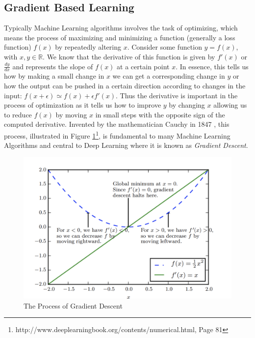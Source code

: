 \documentclass[14pt]{extarticle}
\numberwithin{equation}{section}
\begin{document}
		\subsection{Gradient Based Learning}		
		Typically Machine Learning algorithms involves the task of optimizing, which means the process of maximizing and minimizing a function (generally a loss function) $f(x)$ by repeatedly altering $x$\cite{Goodfellow-et-al-2016}.
		Consider some function $y = f(x)$, with $x, y \in \mathbb{R}$. We know that the derivative of this function is given by $f'(x) $ or $\frac{dy}{dx}$ and represents the slope of $f(x)$ at a certain point $x$. In essence, this tells us how by making a small change in $x$ we can get a corresponding change in $y$ or how the output can be pushed in a certain direction according to changes in the input: $f(x + \epsilon) \simeq f(x) + \epsilon f'(x)$.  Thus the derivative is important in the process of optimization as it tells us how to improve $y$ by changing $x$ allowing us to reduce $f(x)$ by moving $x$ in small steps with the opposite sign of the computed derivative. Invented by the mathematician Cauchy in 1847 \cite{cauchy1847methode}, this process, illustrated in Figure \ref{grad_descent}\footnote{http://www.deeplearningbook.org/contents/numerical.html, Page 81}, is fundamental to many Machine Learning Algorithms and central to Deep Learning where it is known as \textit{Gradient Descent}.
				\begin{figure}[h]
			\vspace{0.2cm}
			\centering
			\includegraphics[scale=0.8]{grad_descent}
			\caption{The Process of Gradient Descent\cite{Goodfellow-et-al-2016}
				\label{grad_descent}}
		\end{figure}
	\pagebreak
\end{document}
